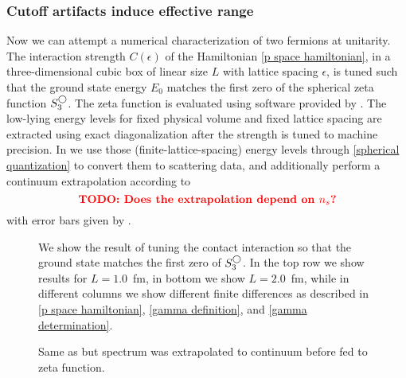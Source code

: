 \subsubsection{Cutoff artifacts induce effective range}

Now we can attempt a numerical characterization of two fermions at unitarity.
The interaction strength $C(\epsilon)$ of the Hamiltonian \eqref{p space hamiltonian}, in a three-dimensional cubic box of linear size $L$ with lattice spacing $\epsilon$, is tuned such that the ground state energy $E_0$ matches the first zero of the spherical zeta function $S^{\bigcirc}_3$.
The zeta function is evaluated using software provided by .
The low-lying energy levels for fixed physical volume and fixed lattice spacing are extracted using exact diagonalization after the strength is tuned to machine precision.
In  we use those (finite-lattice-spacing) energy levels through \eqref{spherical quantization} to convert them to scattering data, and additionally perform a continuum extrapolation according to
\begin{equation}
    \text{{\bf\color{red}TODO: Does the extrapolation depend on \ensuremath{{n_s}}?}}
\end{equation}
with error bars given by .  

\begin{figure}[th]
    
    \caption{We show the result of tuning the contact interaction so that the ground state matches the first zero of $S^{\bigcirc}_3$.  In the top row we show results for $L=1.0$~fm, in bottom we show $L=2.0$~fm, while in different columns we show different finite differences as described in \eqref{p space hamiltonian}, \eqref{gamma definition}, and \eqref{gamma determination}. }
    \label{fig:unimproved spherical}
\end{figure}

\begin{figure}[th]
    
    \caption{Same as  but spectrum was extrapolated to continuum before fed to zeta function.}
    \label{fig:unimproved spherical continuum extrapolation}
\end{figure}

